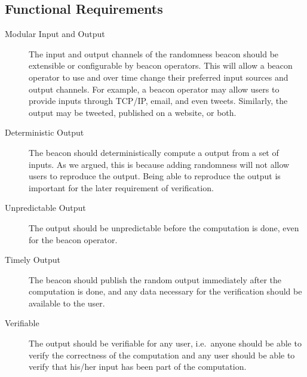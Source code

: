 \subsection{Functional Requirements}
\label{sub:functional_requirements}
\begin{description}
    \item[Modular Input and Output]
The input and output channels of the randomness beacon should be extensible or configurable by beacon operators.
This will allow a beacon operator to use and over time change their preferred input sources and output channels.
For example, a beacon operator may allow users to provide inputs through TCP/IP, email, and even tweets.
Similarly, the output may be tweeted, published on a website, or both.

    \item[Deterministic Output]
The beacon should deterministically compute a output from a set of inputs.
As we argued, this is because adding randomness will not allow users to reproduce the output.
Being able to reproduce the output is important for the later requirement of verification.

    \item[Unpredictable Output]
The output should be unpredictable before the computation is done, even for the beacon operator.


    \item[Timely Output]
The beacon should publish the random output immediately after the computation is done, and any data necessary for the verification should be available to the user.

    \item[Verifiable]
The output should be verifiable for any user, i.e.\ anyone should be able to verify the correctness of the computation and any user should be able to verify that his/her input has been part of the computation.
\end{description}

